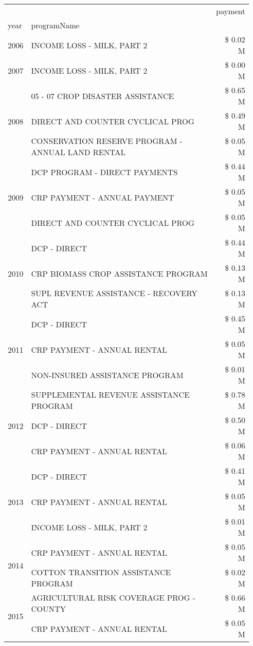 \begin{tabular}{llr}
\toprule
 &  & payment \\
year & programName &  \\
\midrule
2006 & INCOME LOSS - MILK, PART 2 & \$ 0.02 M \\
\cline{1-3}
2007 & INCOME LOSS - MILK, PART 2 & \$ 0.00 M \\
\cline{1-3}
\multirow[t]{3}{*}{2008} & 05 - 07 CROP DISASTER ASSISTANCE & \$ 0.65 M \\
 & DIRECT AND COUNTER CYCLICAL PROG & \$ 0.49 M \\
 & CONSERVATION RESERVE PROGRAM - ANNUAL LAND RENTAL & \$ 0.05 M \\
\cline{1-3}
\multirow[t]{3}{*}{2009} & DCP PROGRAM - DIRECT PAYMENTS & \$ 0.44 M \\
 & CRP PAYMENT - ANNUAL PAYMENT & \$ 0.05 M \\
 & DIRECT AND COUNTER CYCLICAL PROG & \$ 0.05 M \\
\cline{1-3}
\multirow[t]{3}{*}{2010} & DCP - DIRECT & \$ 0.44 M \\
 & CRP BIOMASS CROP ASSISTANCE PROGRAM & \$ 0.13 M \\
 & SUPL REVENUE ASSISTANCE - RECOVERY ACT & \$ 0.13 M \\
\cline{1-3}
\multirow[t]{3}{*}{2011} & DCP - DIRECT & \$ 0.45 M \\
 & CRP PAYMENT - ANNUAL RENTAL & \$ 0.05 M \\
 & NON-INSURED ASSISTANCE PROGRAM & \$ 0.01 M \\
\cline{1-3}
\multirow[t]{3}{*}{2012} & SUPPLEMENTAL REVENUE ASSISTANCE PROGRAM & \$ 0.78 M \\
 & DCP - DIRECT & \$ 0.50 M \\
 & CRP PAYMENT - ANNUAL RENTAL & \$ 0.06 M \\
\cline{1-3}
\multirow[t]{3}{*}{2013} & DCP - DIRECT & \$ 0.41 M \\
 & CRP PAYMENT - ANNUAL RENTAL & \$ 0.05 M \\
 & INCOME LOSS - MILK, PART 2 & \$ 0.01 M \\
\cline{1-3}
\multirow[t]{2}{*}{2014} & CRP PAYMENT - ANNUAL RENTAL & \$ 0.05 M \\
 & COTTON TRANSITION ASSISTANCE PROGRAM & \$ 0.02 M \\
\cline{1-3}
\multirow[t]{2}{*}{2015} & AGRICULTURAL RISK COVERAGE PROG - COUNTY & \$ 0.66 M \\
 & CRP PAYMENT - ANNUAL RENTAL & \$ 0.05 M \\

\end{tabular}
